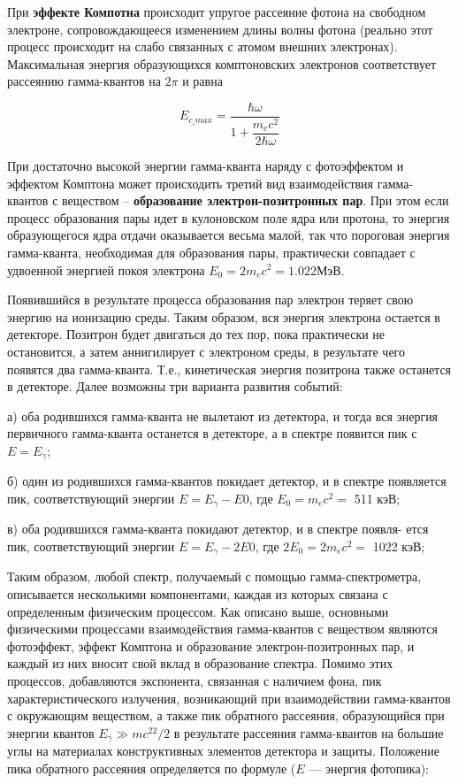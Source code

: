 \documentclass[12pt,a4paper]{article}
\begin{document}
При \textbf{эффекте Компотна} происходит упругое рассеяние фотона на свободном электроне, сопровождающееся изменением длины волны фотона (реально этот процесс происходит на слабо связанных с атомом внешних электронах). Максимальная энергия образующихся комптоновских электронов соответствует рассеянию гамма-квантов на $ 2\pi $ и равна
	
\begin{equation}\label{E_compton}
	E_{c \_ max} = \dfrac{\hbar \omega}{1 + \dfrac{m_ec^2}{2\hbar\omega}}
\end{equation}
	
При достаточно высокой энергии гамма-кванта наряду с фотоэффектом и эффектом Комптона может происходить третий вид взаимодействия гамма-квантов с веществом – \textbf{образование электрон-позитронных пар}. При этом если процесс образования пары идет в кулоновском поле ядра или протона, то энергия образующегося ядра отдачи оказывается весьма малой, так что пороговая энергия гамма-кванта, необходимая для образования пары, практически совпадает с удвоенной энергией покоя электрона $ E_0 = 2m_ec^2 = 1.022  $МэВ.
	
Появившийся в результате процесса образования пар электрон теряет свою энергию на ионизацию среды. Таким образом, вся энергия электрона остается в детекторе. Позитрон будет двигаться до тех пор, пока практически не остановится, а затем аннигилирует с электроном среды, в результате чего появятся два гамма-кванта. Т.е., кинетическая энергия позитрона также останется в детекторе. Далее возможны три варианта развития событий:
	
а) оба родившихся гамма-кванта не вылетают из детектора, и тогда вся энергия первичного гамма-кванта останется в детекторе, а в спектре появится пик с $ E = E_\gamma $;
	
б) один из родившихся гамма-квантов покидает детектор, и в спектре появляется пик, соответствующий энергии $ E = E_\gamma - E0 $, где $ E_0 = m_ec^2 = $ 511 кэВ;
	
в) оба родившихся гамма-кванта покидают детектор, и в спектре появля- ется пик, соответствующий энергии $ E = E_\gamma - 2E0 $, где $ 2E_0 = 2m_ec^2 = $ 1022 кэВ;
	
Таким образом, любой спектр, получаемый с помощью гамма-спектрометра, описывается несколькими компонентами, каждая из которых связана с определенным физическим процессом. Как описано выше, основными физическими процессами взаимодействия гамма-квантов с веществом являются фотоэффект, эффект Комптона и образование электрон-позитронных пар, и каждый из них вносит свой вклад в образование спектра. Помимо этих процессов, добавляются экспонента, связанная с наличием фона, пик характеристического излучения, возникающий при взаимодействии гамма-квантов с окружающим веществом, а также пик обратного рассеяния, образующийся при энергии квантов $ E_\gamma \gg mc^22/2 $ в результате рассеяния гамма-квантов на большие углы на материалах конструктивных элементов детектора и защиты. Положение пика обратного рассеяния определяется по формуле ($ E $ --- энергия фотопика):
	
\end{document}
